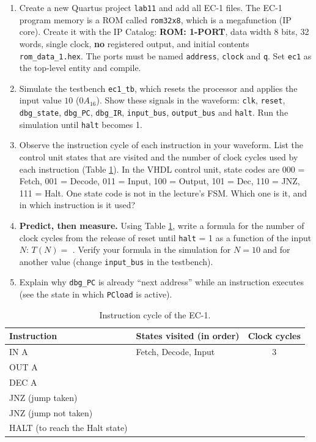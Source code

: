 \documentclass{article}
\begin{document}
\begin{enumerate}
    \item Create a new Quartus project \texttt{lab11} and add all EC-1 files. The EC-1 program memory is a ROM called \texttt{rom32x8}, which is a megafunction (IP core). Create it with the IP Catalog: \textbf{ROM: 1-PORT}, data width 8 bits, 32 words, single clock, \textbf{no} registered output, and initial contents \texttt{rom\_data\_1.hex}. The ports must be named \texttt{address}, \texttt{clock} and \texttt{q}. Set \texttt{ec1} as the top-level entity and compile.
    \item Simulate the testbench \texttt{ec1\_tb}, which resets the processor and applies the input value $10$ ($0A_{16}$). Show these signals in the waveform: \texttt{clk}, \texttt{reset}, \texttt{dbg\_state}, \texttt{dbg\_PC}, \texttt{dbg\_IR}, \texttt{input\_bus}, \texttt{output\_bus} and \texttt{halt}. Run the simulation until \texttt{halt} becomes 1.
    \item Observe the instruction cycle of each instruction in your waveform. List the control unit states that are visited and the number of clock cycles used by each instruction (Table \ref{tab:cycles}). In the VHDL control unit, state codes are 000 = Fetch, 001 = Decode, 011 = Input, 100 = Output, 101 = Dec, 110 = JNZ, 111 = Halt. One state code is not in the lecture's FSM. Which one is it, and in which instruction is it used? \underline{\hspace{4cm}}
    \item \textbf{Predict, then measure.} Using Table \ref{tab:cycles}, write a formula for the number of clock cycles from the release of reset until \texttt{halt} = 1 as a function of the input $N$: $T(N) = $ \underline{\hspace{6cm}}. Verify your formula in the simulation for $N = 10$ and for another value (change \texttt{input\_bus} in the testbench).
    \item Explain why \texttt{dbg\_PC} is already ``next address'' while an instruction executes (see the state in which \texttt{PCload} is active).
\end{enumerate}

\begin{table}[H]
    \centering
    \begin{tabular}{|l|l|c|}
        \hline
        \textbf{Instruction} & \textbf{States visited (in order)} & \textbf{Clock cycles} \\
        \hline
        IN A & Fetch, Decode, Input & 3 \\ \hline
        OUT A & & \\ \hline
        DEC A & & \\ \hline
        JNZ (jump taken) & & \\ \hline
        JNZ (jump not taken) & & \\ \hline
        HALT (to reach the Halt state) & & \\ \hline
    \end{tabular}
    \caption{Instruction cycle of the EC-1.}
    \label{tab:cycles}
\end{table}
\end{document}
